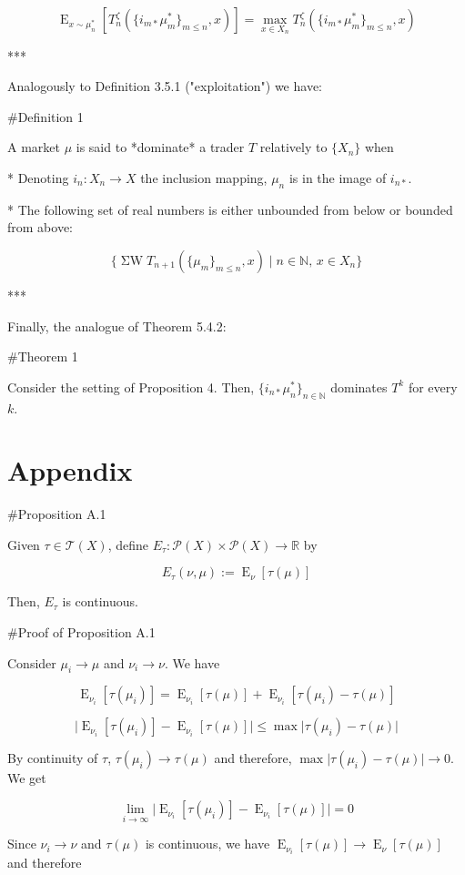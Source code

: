 \documentclass[a4paper]{article}
\DeclareMathOperator{\E}{E}
\newcommand{\Nats}{\mathbb{N}}
\newcommand{\Reals}{\mathbb{R}}
\newcommand{\Abs}[1]{\lvert #1 \rvert}
\newcommand{\Prob}{\mathcal{P}}
\newcommand{\T}{\mathcal{T}(X)}
\newcommand{\SW}{\operatorname{\Sigma W}}
\begin{document}
$$\E_{x \sim \mu^*_n}[T^\zeta_n(\{i_{m*}\mu^*_m\}_{m \leq n},x)] = \max_{x \in X_n} T^\zeta_n(\{i_{m*}\mu^*_m\}_{m \leq n},x)$$

***

Analogously to Definition 3.5.1 ("exploitation") we have:

\#Definition 1

A market ${\mu}$ is said to *dominate* a trader ${T}$ relatively to ${\{X_n\}}$ when

* Denoting ${i_n: X_n \rightarrow X}$ the inclusion mapping, ${\mu_n}$ is in the image of ${i_{n*}}$.

* The following set of real numbers is either unbounded from below or bounded from above:

$$\{\SW T_{n+1}(\{\mu_m\}_{m \leq n},x) \mid n \in \Nats,\, x \in X_n\}$$

***

Finally, the analogue of Theorem 5.4.2:

\#Theorem 1

Consider the setting of Proposition 4. Then, ${\{i_{n*}\mu^*_n\}_{n \in \Nats}}$ dominates ${T^k}$ for every ${k}$.

\section{Appendix}

\#Proposition A.1

Given ${\tau \in \T}$, define ${E_\tau: \Prob(X) \times \Prob(X) \rightarrow \Reals}$ by

$$E_\tau(\nu,\mu):=\E_\nu[\tau(\mu)]$$

Then, ${E_\tau}$ is continuous.

\#Proof of Proposition A.1

Consider ${\mu_i \rightarrow \mu}$ and ${\nu_i \rightarrow \nu}$. We have

$$\E_{\nu_i}[\tau(\mu_i)] = \E_{\nu_i}[\tau(\mu)] + \E_{\nu_i}[\tau(\mu_i) - \tau(\mu)]$$

$$\Abs{\E_{\nu_i}[\tau(\mu_i)] - \E_{\nu_i}[\tau(\mu)]} \leq \max\Abs{\tau(\mu_i) - \tau(\mu)}$$

By continuity of ${\tau}$, ${\tau(\mu_i) \rightarrow \tau(\mu)}$ and therefore, $\max\Abs{\tau(\mu_i) - \tau(\mu)} \rightarrow 0$. We get

$$\lim_{i \rightarrow \infty} \Abs{\E_{\nu_i}[\tau(\mu_i)] - \E_{\nu_i}[\tau(\mu)]} = 0$$

Since ${\nu_i \rightarrow \nu}$ and ${\tau(\mu)}$ is continuous, we have ${\E_{\nu_i}[\tau(\mu)] \rightarrow \E_{\nu}[\tau(\mu)]}$ and therefore
\end{document}
